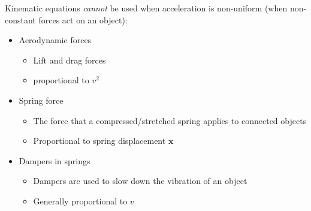 Kinematic equations \emph{cannot} be used when acceleration is non-uniform
(when non-constant forces act on an object):
\begin{itemize}
\item Aerodynamic forces
  \begin{itemize}
  \item Lift and drag forces
  \item proportional to $v^2$
  \end{itemize}
\item Spring force
  \begin{itemize}
  \item The force that a compressed/stretched spring applies to connected
    objects
  \item Proportional to spring displacement $\mathbf x$
  \end{itemize}
\item Dampers in springs
  \begin{itemize}
  \item Dampers are used to slow down the vibration of an object
  \item Generally proportional to $v$
  \end{itemize}
\end{itemize}  




